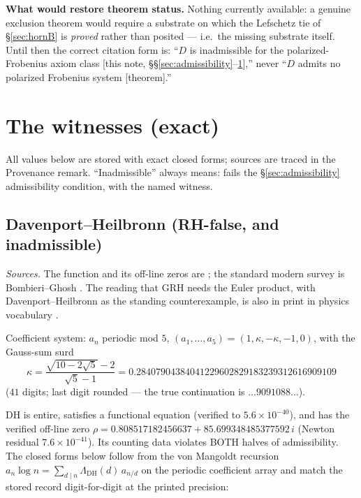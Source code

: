 \documentclass[11pt]{article}
\theoremstyle{plain}
\theoremstyle{definition}
\theoremstyle{remark}
\begin{document}
\medskip
\noindent\textbf{What would restore theorem status.} Nothing currently
available: a genuine exclusion theorem would require a substrate on which the
Lefschetz tie of \S\ref{sec:hornB} is \emph{proved} rather than posited ---
i.e.\ the missing substrate itself. Until then the correct citation form is:
``$D$ is inadmissible for the polarized-Frobenius axiom class [this note,
\S\S\ref{sec:admissibility}--\ref{sec:witnesses}],'' never ``$D$ admits no
polarized Frobenius system [theorem].''

\section{The witnesses (exact)}\label{sec:witnesses}

All values below are stored with exact closed forms; sources are traced in the
Provenance remark. ``Inadmissible'' always means: fails the
\S\ref{sec:admissibility} admissibility condition, with the named witness.

\subsection{Davenport--Heilbronn (RH-false, and inadmissible)}\label{sec:dh}

\emph{Sources.} The function and its off-line zeros are \cite{DH1936a, DH1936};
the standard modern survey is Bombieri--Ghosh \cite{BG11}. The reading that GRH
needs the Euler product, with Davenport--Heilbronn as the standing counterexample,
is also in print in physics vocabulary \cite{LM24, FL14}.

Coefficient system: $a_n$ periodic mod $5$,
$(a_1, \ldots, a_5) = (1, \kappa, -\kappa, -1, 0)$, with the Gauss-sum surd
\begin{equation*}
\kappa = \frac{\sqrt{10 - 2\sqrt{5}} - 2}{\sqrt{5} - 1}
= 0.28407904384041229602829183239312616909109
\end{equation*}
($41$ digits; last digit rounded --- the true continuation is
$\ldots 9091088\ldots$).

DH is entire, satisfies a functional equation (verified to
$5.6 \times 10^{-40}$), and has the verified off-line zero
$\rho = 0.808517182456637 + 85.699348485377592\,i$ (Newton residual
$7.6 \times 10^{-41}$). Its counting data violates BOTH halves of
admissibility. The closed forms below follow from the von Mangoldt recursion
$a_n \log n = \sum_{d \mid n} \Lambda_{\mathrm{DH}}(d)\, a_{n/d}$ on the
periodic coefficient array and match the stored record digit-for-digit at the
printed precision:
\end{document}
